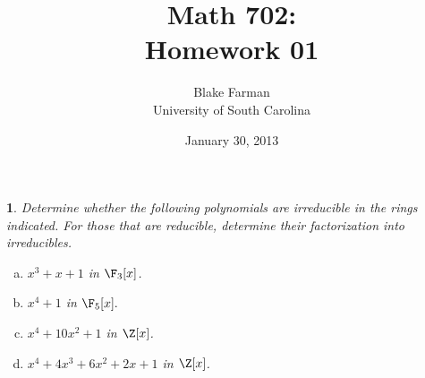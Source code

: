 \documentclass[10pt]{amsart}
\author{Blake Farman\\University of South Carolina}
\title{Math 702:\\Homework 01}
\date{January 30, 2013}
\begin{document}
\maketitle

\providecommand{\p}{\mathfrak{p}}
\providecommand{\m}{\mathfrak{m}}

\newtheorem{thm}{}
\newtheorem{lem}{Lemma}

\setcounter{thm}{1}

\begin{thm}\label{Ex2}
  Determine whether the following polynomials are irreducible in the rings indicated.  For those that are reducible, determine their factorization into irreducibles.
  \begin{enumerate}[(a)]
  \item
    $x^3 + x + 1$ in $\F_3[x]$.
  \item
    $x^4 + 1$ in $\F_5[x].$
  \item
    $x^4 + 10x^2 + 1$ in $\Z[x]$.
  \item
    $x^4 + 4x^3 + 6x^2 +2x + 1$ in $\Z[x]$.
  \end{enumerate}
  

\end{thm}
\end{document}
